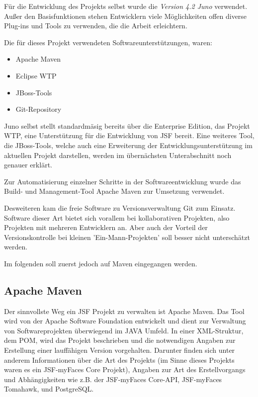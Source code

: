 \documentclass[12pt, twoside, a4paper, ngerman]{article}
\begin{document}
Für die Entwicklung des Projekts selbst wurde die \textit{Version 4.2 Juno} verwendet.
Außer den Basisfunktionen stehen Entwicklern viele Möglichkeiten offen diverse Plug-ins und Tools zu verwenden, die die Arbeit erleichtern.

Die für dieses Projekt verwendeten Softwareunterstützungen, waren:
\begin{itemize}
	\item \gls{Apache Maven}
	\item Eclipse WTP
	\item JBoss-Tools
	\item Git-Repository
\end{itemize}
  
Juno selbst stellt standardmäsig bereits über die Enterprise Edition, das Projekt \ac{WTP}, eine Unterstützung für die Entwicklung von JSF bereit. 
Eine weiteres Tool, die \gls{JBoss}-Tools, welche auch eine Erweiterung der Entwicklungsunterstützung im aktuellen Projekt darstellen, werden im übernächsten Unterabschnitt noch genauer erklärt.

Zur Automatisierung einzelner Schritte in der Softwareentwicklung wurde das Build- und Management-Tool Apache Maven zur Umsetzung verwendet. 

Desweiteren kam die freie Software zu Versionsverwaltung \gls{Git} zum Einsatz. Software dieser Art bietet sich vorallem bei kollaborativen Projekten, also Projekten mit mehreren Entwicklern an. 
Aber auch der Vorteil der Versionskontrolle bei kleinen 'Ein-Mann-Projekten' soll besser nicht unterschätzt werden.           
	 
Im folgenden soll zuerst jedoch auf Maven eingegangen werden.
\subsection{Apache Maven}

Der sinnvollste Weg ein \ac{JSF} Projekt zu verwalten ist Apache Maven.
Das Tool wird von der \gls{Apache Software Foundation} entwickelt und dient zur Verwaltung von Softwareprojekten überwiegend im JAVA Umfeld. In einer \gls{XML}-Struktur, dem \ac{POM}, wird das Projekt beschrieben und die notwendigen Angaben zur Erstellung einer lauffähigen Version vorgehalten. Darunter finden sich unter anderem Informationen über die Art des Projekts (im Sinne dieses Projekts waren es ein JSF-myFaces Core Projekt), Angaben zur Art des Erstellvorgangs und Abhängigkeiten wie z.B. der JSF-myFaces Core-\gls{API}, JSF-myFaces Tomahawk, und \gls{PostgreSQL}.
\end{document}
